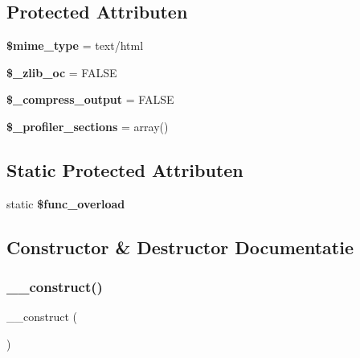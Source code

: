 \subsection*{Protected Attributen}
\begin{DoxyCompactItemize}
\item 
\mbox{\label{class_c_i___output_a4d1985caafb49b059e3ca3dedfee257a}} 
{\bfseries \$mime\+\_\+type} = \textquotesingle{}text/html\textquotesingle{}
\item 
\mbox{\label{class_c_i___output_a76d91b71069ec82a31b4d12643e0ca40}} 
{\bfseries \$\+\_\+zlib\+\_\+oc} = F\+A\+L\+SE
\item 
\mbox{\label{class_c_i___output_a9b8f5f282f8cf7b10d1b03b219df1386}} 
{\bfseries \$\+\_\+compress\+\_\+output} = F\+A\+L\+SE
\item 
\mbox{\label{class_c_i___output_a4d239124375bbbdb9a4f5a0260505c40}} 
{\bfseries \$\+\_\+profiler\+\_\+sections} = array()
\end{DoxyCompactItemize}
\subsection*{Static Protected Attributen}
\begin{DoxyCompactItemize}
\item 
\mbox{\label{class_c_i___output_aef84be58d58a5895572c5689e56a1047}} 
static {\bfseries \$func\+\_\+overload}
\end{DoxyCompactItemize}


\subsection{Constructor \& Destructor Documentatie}
\mbox{\label{class_c_i___output_a095c5d389db211932136b53f25f39685}} 
\subsubsection{\texorpdfstring{\_\_construct()}{\_\_construct()}}
{\footnotesize\ttfamily \+\_\+\+\_\+construct (\begin{DoxyParamCaption}{ }\end{DoxyParamCaption})}

